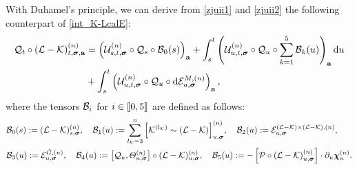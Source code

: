 With Duhamel's principle, we can derive from \eqref{zjuii1} and \eqref{zjuii2} the following counterpart of \eqref{int_K-LcalE}:
\begin{align}\label{int_K-L+Q}
  {\cal Q}_t\circ   (\mathcal{L} - \mathcal{K})^{(n)}_{t, \bsig, \ba} &= 
    \left(\mathcal{U}^{(n)}_{s, t, \bsig} \circ  {\cal Q}_s\circ  {\cal B}_0(s)\right)_{\ba} +   \int_{s}^t \left(\mathcal{U}^{(n)}_{u, t, \bsig} \circ  {\cal Q}_u\circ \sum_{k=1}^5{\cal B}_k(u) \right)_{\ba} \dd u \nonumber\\
    &+  \int_{s}^t \left(\mathcal{U}^{(n)}_{u, t, \bsig} \circ  {\cal Q}_u\circ \dd\mathcal{E}^{M,(n)}_{u, \bsig}\right)_{\ba} ,
\end{align}
where the tensors $\cal B_i$ for $i\in \qqq{0,5}$ are defined as follows:
\begin{align*}
&{\cal B}_0(s):=(\mathcal{L} - \mathcal{K})^{(n)}_{s, \bsig},\quad {\cal B}_1(u):=\sum_{\lenk=3}^n \Big[\mathcal{K}^{(\lenk)} \sim (\mathcal{L} - \mathcal{K})\Big]^{(n)}_{u, \bsig},\quad {\cal B}_2(u):=\mathcal{E}^{(\mathcal{L} - \mathcal{K}) \times (\mathcal{L} - \mathcal{K}),(n)}_{u, \bsig},\\
&{\cal B}_3(u):=\mathcal{E}^{\Gc,(n)}_{u, \bsig},\quad {\cal B}_4(u):= \big[{\cal Q}_u , \varTheta^{(n)}_{u,\bsig} \big]\circ (\mathcal{L} - \mathcal{K})^{(n)}_{u, \bsig },\quad {\cal B}_5(u):= -\br{{\cal P} \circ\left(\mathcal{L} - \mathcal{K}\right)^{(n)}_{u, \bsig}}\cdot \partial_u  \dthn^{(n)}_{u } . 
\end{align*}
